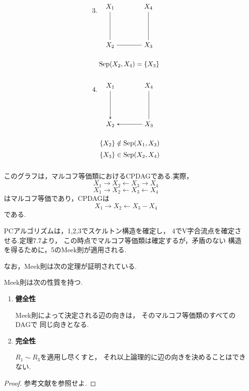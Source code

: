 \documentclass[uplatex, dvipdfmx]{jsarticle}
\begin{document}
\begin{exm}{}
    \[
    \begin{tikzpicture}[>=stealth, node distance=1.7cm]
      \node at (-0.8,0.8) {$3.$};

      \node (X1) at (0,1) {$X_1$};
      \node (X2) at (0,-1) {$X_2$};
      \node (X3) at (2,-1) {$X_3$};
      \node (X4) at (2,1) {$X_4$};

      \draw[-] (X1) -- (X2);
      \draw[-] (X2) -- (X3);
      \draw[-] (X3) -- (X4);

      \node at (1,-2) {$\mathrm{Sep}(X_2,X_4)=\{X_3\}$};
    \end{tikzpicture}
  \]

  \[
    \begin{tikzpicture}[>=stealth, node distance=1.7cm]
      \node at (-0.8,0.8) {$4.$};

      \node (X1) at (0,1) {$X_1$};
      \node (X2) at (0,-1) {$X_2$};
      \node (X3) at (2,-1) {$X_3$};
      \node (X4) at (2,1) {$X_4$};

      \draw[->] (X1) -- (X2);
      \draw[<-] (X2) -- (X3);
      \draw[-] (X3) -- (X4);

      \node at (1,-2) {$\{X_2\}\notin \mathrm{Sep}(X_1,X_3)$};
      \node at (1,-2.6) {$\{X_3\}\in \mathrm{Sep}(X_2,X_4)$};
    \end{tikzpicture}
  \]

  このグラフは，マルコフ等価類におけるCPDAGである.実際，
  \[
    X_1\to X_2\leftarrow X_3\to X_4
  \]
  \[
    X_1\to X_2\leftarrow X_3\leftarrow X_4
  \]
  はマルコフ等価であり，CPDAGは
  \[
    X_1\to X_2\leftarrow X_3 - X_4
  \]
  である.
\end{exm}


PCアルゴリズムは，1,2,3でスケルトン構造を確定し，
4でV字合流点を確定させる.定理7.7より，
この時点でマルコフ等価類は確定するが，矛盾のない
構造を得るために，5のMeek則が適用される.

なお，Meek則は次の定理が証明されている.

\begin{thm}{}
  Meek則は次の性質を持つ.

  \begin{enumerate}
    \item[(i)] \textbf{健全性}
    
    Meek則によって決定される辺の向きは，
    そのマルコフ等価類のすべてのDAGで
    同じ向きとなる.

    \item[(ii)] \textbf{完全性}

    $R_1\sim R_3$を適用し尽くすと，
    それ以上論理的に辺の向きを決めることはできない.
  \end{enumerate}
\end{thm}
\begin{proof}
  参考文献\cite{meek1995}を参照せよ.
\end{proof}
\end{document}
